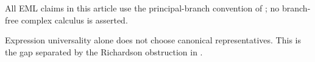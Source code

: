 \begin{remark}\label{rem:eml-variants}
All EML claims in this article use the principal-branch convention of
; no branch-free complex calculus is asserted.
\end{remark}

\begin{remark}\label{rem:no-canon}
Expression universality alone does not choose canonical representatives.  This
is the gap separated by the Richardson obstruction in .
\end{remark}


